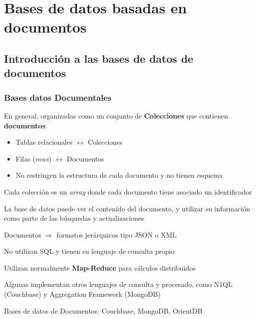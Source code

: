 \section{Bases de datos basadas en documentos}
\subsection{Introducción a las bases de datos de documentos}
\subsubsection{Bases datos Documentales}
En general, organizadas como un conjunto de \textbf{Colecciones} que contienen \textbf{documentos}:
\begin{itemize}
\item Tablas relacionales $\leftrightarrow$ Colecciones
\item Filas (\textit{rows}) $\leftrightarrow$ Documentos
\item No restringen la estructura de cada documento y no tienen esquema
\end{itemize}
Cada colección es un \textit{array} donde cada documento tiene asociado un identificador

La base de datos puede ver el contenido del documento, y utilizar su información como parte de las búsquedas y actualizaciones

Documentos $\Rightarrow$ formatos jerárquicos tipo JSON o XML

No utilizan SQL y tienen su lenguaje de consulta propio

Utilizan normalmente \textbf{Map-Reduce} para cálculos distribuidos

Algunas implementan otros lenguajes de consulta y procesado, como N1QL (Couchbase) y Aggregation Framework (MongoDB)

Bases de datos de Documentos: Couchbase, MongoDB, OrientDB
